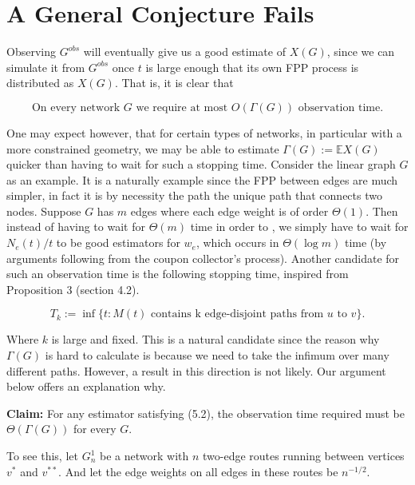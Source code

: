 \section{A General Conjecture Fails}

Observing $G^{obs}$ will eventually give us a good estimate of $X(G)$, since we can simulate it from $G^{obs}$ once $t$ is large enough that its own FPP process is distributed as $X(G)$. That is, it is clear that 

\begin{equation}
\text{ On every network } G \text{ we require at most } O(\Gamma(G)) \text{ observation time. }
\end{equation}


One may expect however, that for certain types of networks, in particular with a more constrained geometry, we may be able to estimate $\Gamma(G) := \mathbb{E}X(G)$ quicker than having to wait for such a stopping time. Consider the linear graph $G$ as an example.  It is a naturally example since the FPP between edges are much simpler, in fact it is by necessity the path the unique path that connects two nodes. Suppose $G$ has $m$ edges where each edge weight is of order $\Theta(1)$.  Then instead of having to wait for $\Theta(m)$ time in order to , we simply have to wait for $N_e(t)/t$ to be good estimators for $w_e$, which occurs in $\Theta(\log m)$ time (by arguments following from the coupon collector's process).  Another candidate for such an observation time is the following stopping time, inspired from Proposition 3 (section 4.2).  

\begin{equation}
T_k := \inf \{t: M(t) \text{ contains k edge-disjoint paths from } u \text{ to } v\}.
\end{equation}

Where $k$ is large and fixed.  This is a natural candidate since the reason why $\Gamma(G)$ is hard to calculate is because we need to take the infimum over many different paths.  However, a result in this direction is not likely.  Our argument below offers an explanation why.  

\begin{center}
\textbf{Claim:} For any estimator satisfying (5.2), the observation time required must be $\Theta(\Gamma(G))$ for every $G$.  
\end{center}

To see this, let $G_n^{1}$ be a network with $n$ two-edge routes running between vertices $v^*$ and $v^{**}$.  And let the edge weights on all edges in these routes be $n^{-1/2}$.

